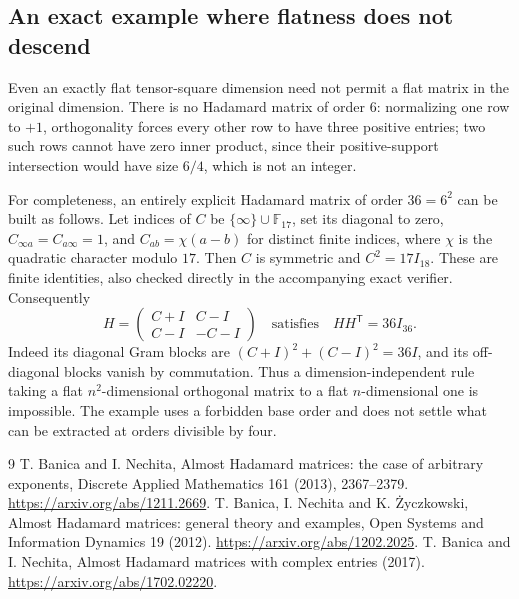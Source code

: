 \documentclass[11pt]{article}
\begin{document}
\subsection{An exact example where flatness does not descend}
Even an exactly flat tensor-square dimension need not permit a flat
matrix in the original dimension. There is no Hadamard matrix of order
$6$: normalizing one row to $+1$, orthogonality forces every other row
to have three positive entries; two such rows cannot have zero inner
product, since their positive-support intersection would have size
$6/4$, which is not an integer.

For completeness, an entirely explicit Hadamard matrix of order
$36=6^2$ can be built as follows. Let indices of $C$ be
$\{\infty\}\cup\mathbb F_{17}$, set its diagonal to zero,
$C_{\infty a}=C_{a\infty}=1$, and
$C_{ab}=\chi(a-b)$ for distinct finite indices, where $\chi$ is the
quadratic character modulo $17$. Then $C$ is symmetric and
$C^2=17I_{18}$. These are finite identities, also checked directly in
the accompanying exact verifier. Consequently
\[
 H=\begin{pmatrix}C+I&C-I\\ C-I&-C-I\end{pmatrix}
 \quad\text{satisfies}\quad HH^{\mathsf T}=36I_{36}.
\]
Indeed its diagonal Gram blocks are
$(C+I)^2+(C-I)^2=36I$, and its off-diagonal blocks vanish by
commutation. Thus a dimension-independent rule taking a flat
$n^2$-dimensional orthogonal matrix to a flat $n$-dimensional one is
impossible. The example uses a forbidden base order and does not
settle what can be extracted at orders divisible by four.

\begin{thebibliography}{9}
 T. Banica and I. Nechita, Almost Hadamard matrices:
the case of arbitrary exponents, Discrete Applied Mathematics 161
(2013), 2367--2379. \url{https://arxiv.org/abs/1211.2669}.
 T. Banica, I. Nechita and K. \.{Z}yczkowski,
Almost Hadamard matrices: general theory and examples,
Open Systems and Information Dynamics 19 (2012).
\url{https://arxiv.org/abs/1202.2025}.
 T. Banica and I. Nechita,
Almost Hadamard matrices with complex entries (2017).
\url{https://arxiv.org/abs/1702.02220}.
\end{thebibliography}
\end{document}
